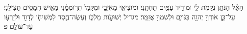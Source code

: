 \documentclass{openreader}
\begin{document}
הָאֵ֕ל הַנֹּתֵ֥ן נְקָמֹ֖ת לִ֑י וּמֹורִ֥יד עַמִּ֖ים תַּחְתֵּֽנִי׃ 
וּמֹוצִיאִ֖י מֵאֹֽיְבָ֑י וּמִקָּמַי֙ תְּרֹ֣ומְמֵ֔נִי מֵאִ֥ישׁ חֲמָסִ֖ים תַּצִּילֵֽנִי׃ 
עַל־כֵּ֛ן אֹודְךָ֥ יְהוָ֖ה בַּגֹּויִ֑ם וּלְשִׁמְךָ֖ אֲזַמֵּֽר׃ 
מגדיל יְשׁוּעֹ֣ות מַלְכֹּ֑ו וְעֹֽשֶׂה־חֶ֧סֶד לִמְשִׁיחֹ֛ו לְדָוִ֥ד וּלְזַרְעֹ֖ו עַד־עֹולָֽם׃ פ 
\end{document}
